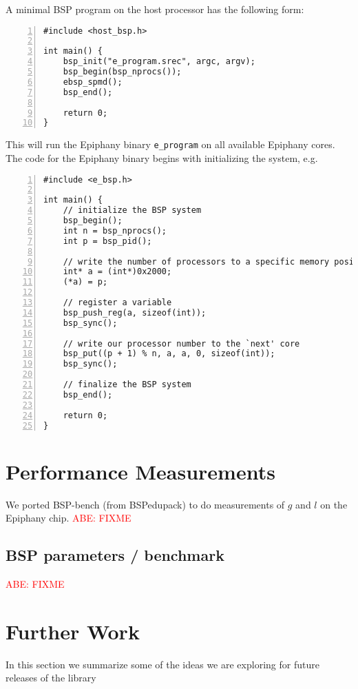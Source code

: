 \documentclass[fleqn]{article}
\renewcommand{\(}{\left(}
\renewcommand{\)}{\right)}
\newcommand{\todo}[1]{\textcolor{red}{#1}}
\begin{document}
A minimal BSP program on the host processor has the following form:
\begin{lstlisting}[numbers = left]
#include <host_bsp.h>

int main() {
    bsp_init("e_program.srec", argc, argv);
    bsp_begin(bsp_nprocs());
    ebsp_spmd();
    bsp_end();

    return 0;
}
\end{lstlisting}
This will run the Epiphany binary \verb.e_program. on all available Epiphany cores. The code for the Epiphany binary begins with initializing the system, e.g.\
\begin{lstlisting}[numbers = left]
#include <e_bsp.h>

int main() {
    // initialize the BSP system
    bsp_begin();
    int n = bsp_nprocs();
    int p = bsp_pid();

    // write the number of processors to a specific memory position
    int* a = (int*)0x2000;
    (*a) = p;

    // register a variable
    bsp_push_reg(a, sizeof(int));
    bsp_sync();

    // write our processor number to the `next' core
    bsp_put((p + 1) % n, a, a, 0, sizeof(int));
    bsp_sync();

    // finalize the BSP system
    bsp_end();

    return 0;
}
\end{lstlisting}
\section{Performance Measurements}
We ported BSP-bench (from BSPedupack) to do measurements of $g$ and $l$ on the Epiphany chip. 
\todo{ABE: FIXME}

\subsection{BSP parameters / benchmark}

\todo{ABE: FIXME}

\section{Further Work}

In this section we summarize some of the ideas we are exploring for future releases of the library
\end{document}
